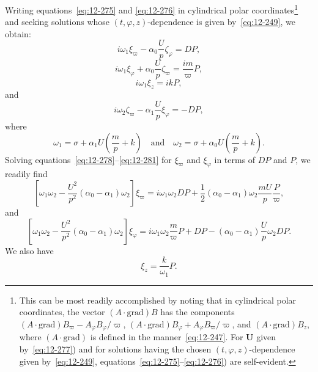 Writing equations~\eqref{eq:12-275} and \eqref{eq:12-276} in cylindrical polar coordinates\footnote{This can be most readily accomplished by noting that in cylindrical polar coordinates, the vector $(A\cdot\text{grad})B$ has the components $(A\cdot\text{grad})B_\varpi - A_\varphi B_\varphi/\varpi$, $(A\cdot\text{grad})B_\varphi + A_\varphi B_\varpi/\varpi$, and $(A\cdot\text{grad})B_z$, where $(A\cdot\text{grad})$ is defined in the manner~\eqref{eq:12-247}. For $\mathbf{U}$ given by~\eqref{eq:12-277}) and for solutions having the chosen $(t,\varphi,z)$-dependence given by~\eqref{eq:12-249}, equations~\eqref{eq:12-275}--\eqref{eq:12-276}) are self-evident.} and seeking solutions whose $(t,\varphi,z)$-dependence is given by~\eqref{eq:12-249}, we obtain:
\begin{equation}
\label{eq:12-278}
i\omega_1\xi_\varpi - \alpha_0\frac{U}{p}\zeta_\varphi = DP,
\end{equation}
\begin{equation}
\label{eq:12-279}
i\omega_1\xi_\varphi + \alpha_0\frac{U}{p}\zeta_\varpi = \frac{im}{\varpi}P,
\end{equation}
\begin{equation}
\label{eq:12-280}
i\omega_1\xi_z = ikP,
\end{equation}
and
\begin{equation}
\label{eq:12-281}
i\omega_2\zeta_\varpi - \alpha_1\frac{U}{p}\xi_\varphi = -DP,
\end{equation}
where
\begin{equation}
\label{eq:12-282}
\omega_1 = \sigma + \alpha_1 U\left(\frac{m}{p}+k\right) \quad \text{and} \quad \omega_2 = \sigma + \alpha_0 U\left(\frac{m}{p}+k\right).
\end{equation}
Solving equations~\eqref{eq:12-278}--\eqref{eq:12-281} for $\xi_\varpi$ and $\xi_\varphi$ in terms of $DP$ and $P$, we readily find
\begin{equation}
\label{eq:12-283}
\left[\omega_1\omega_2 - \frac{U^2}{p^2}(\alpha_0 - \alpha_1)\omega_2\right]\xi_\varpi = i\omega_1\omega_2 DP + \frac{1}{2}(\alpha_0 - \alpha_1)\omega_2\frac{mU}{p}\frac{P}{\varpi},
\end{equation}
and
\begin{equation}
\label{eq:12-284}
\left[\omega_1\omega_2 - \frac{U^2}{p^2}(\alpha_0 - \alpha_1)\omega_2\right]\xi_\varphi = i\omega_1\omega_2\frac{m}{\varpi}P + DP - (\alpha_0 - \alpha_1)\frac{U}{p}\omega_2 DP.
\end{equation}
We also have
\begin{equation}
\label{eq:12-285}
\xi_z = \frac{k}{\omega_1}P.
\end{equation}
